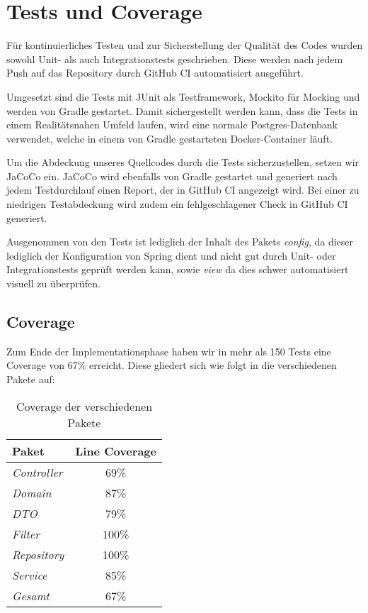 
\chapter{Tests und Coverage}
\label{ch:tests}

Für kontinuierliches Testen und zur Sicherstellung der Qualität des Codes wurden sowohl Unit- als auch Integrationstests geschrieben.
Diese werden nach jedem Push auf das Repository durch GitHub CI automatisiert ausgeführt.

Umgesetzt sind die Tests mit JUnit als Testframework, Mockito für Mocking und werden von Gradle gestartet.
Damit sichergestellt werden kann, dass die Tests in einem Realitätsnahen Umfeld laufen,
wird eine normale Postgres-Datenbank verwendet, welche in einem von Gradle gestarteten Docker-Container läuft.

Um die Abdeckung unseres Quellcodes durch die Tests sicherzustellen, setzen wir JaCoCo ein.
JaCoCo wird ebenfalls von Gradle gestartet und generiert nach jedem Testdurchlauf einen Report, der in GitHub CI angezeigt wird.
Bei einer zu niedrigen Testabdeckung wird zudem ein fehlgeschlagener Check in GitHub CI generiert.

Ausgenommen von den Tests ist lediglich der Inhalt des Pakets \textit{config},
da dieser lediglich der Konfiguration von Spring dient und nicht gut durch Unit- oder Integrationstests geprüft werden kann, sowie \textit{view} da dies schwer automatisiert visuell zu überprüfen.

\newpage

\section{Coverage}\label{sec:coverage}

Zum Ende der Implementationsphase haben wir in mehr als 150 Tests eine Coverage von 67\% erreicht.
Diese gliedert sich wie folgt in die verschiedenen Pakete auf:

\begin{table}[h]
    \centering
    \renewcommand{\arraystretch}{1.3}
    \begin{tabular}{l|c}
        \textbf{Paket} & \textbf{Line Coverage} \\
        \hline
        \hline
        \textit{Controller}  & 69\% \\
        \textit{Domain}      & 87\% \\
        \textit{DTO}         & 79\% \\
        \textit{Filter}      & 100\% \\
        \textit{Repository}  & 100\% \\
        \textit{Service}     & 85\% \\
        \hline
        \textit{Gesamt}      & 67\% \\
    \end{tabular}
    \caption{Coverage der verschiedenen Pakete}
    \label{tab:progress}
\end{table}
